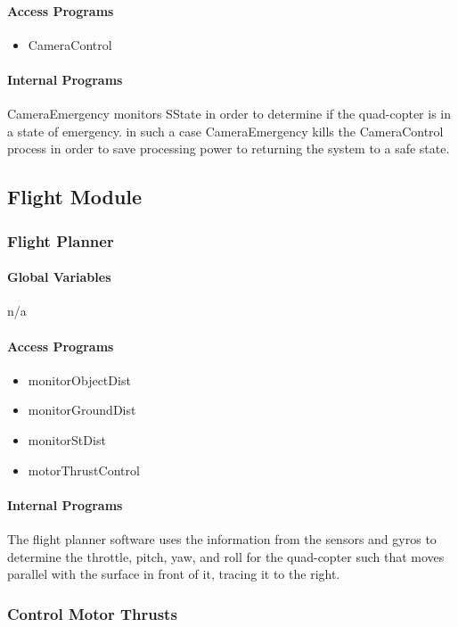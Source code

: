 \documentclass[10pt,letterpaper]{article}
\begin{document}
\paragraph{Access Programs}
\begin{itemize}
\item CameraControl
\end{itemize}

\paragraph{Internal Programs}
CameraEmergency monitors SState in order to determine if the quad-copter is in a state of emergency. in such a case CameraEmergency kills the CameraControl process in order to save processing power to returning the system to a safe state.

\newpage

\subsection{Flight Module}
\subsubsection{Flight Planner}

\paragraph{Global Variables}
n/a

\paragraph{Access Programs}
\begin{itemize} 
\item monitorObjectDist
\item monitorGroundDist
\item monitorStDist
\item motorThrustControl
\end{itemize}
\paragraph{Internal Programs}
The flight planner software uses the information from the sensors and gyros to determine the throttle, pitch, yaw, and roll for the quad-copter such that moves parallel with the surface in front of it, tracing it to the right. 

\subsubsection{Control Motor Thrusts}
\end{document}
